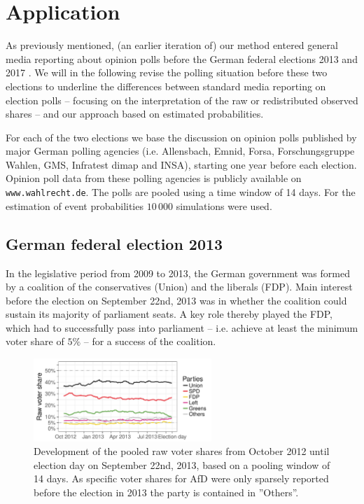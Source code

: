 \documentclass[smallcondensed]{svjour3}     %
\begin{document}
\section{Application} \label{sec:application}
As previously mentioned, (an earlier iteration of) our method entered
general media reporting about opinion polls before the German federal elections
2013 and 2017 \citep[cf.][]{wahlistik_2013, gelitz_2017}.
We will in the following revise the polling situation before these two elections
to underline the differences between standard media reporting on election polls
-- focusing on the interpretation of the raw or redistributed observed shares --
and our approach based on estimated probabilities.

For each of the two elections we base the discussion on opinion polls published
by major German polling agencies (i.e. Allensbach, Emnid, Forsa, Forschungsgruppe Wahlen,
GMS, Infratest dimap and INSA), starting one year before each election.
Opinion poll data from these polling agencies is publicly available
on \texttt{www.wahlrecht.de}. The polls are pooled using a time window
of 14 days. For the estimation of event probabilities $10\,000$ simulations
were used.


\subsection{German federal election 2013} \label{subsec:2013}
In the legislative period from 2009 to 2013, the German government was formed by
a coalition of the conservatives (Union) and the liberals (FDP).
Main interest before the election on September 22nd, 2013 was in whether the
coalition could sustain its majority of parliament seats. A key role thereby played the FDP,
which had to successfully pass into parliament -- i.e. achieve at least the
minimum voter share of $5\%$ -- for a success of the coalition.

\begin{figure}[H]\centering
\includegraphics[width=0.6\textwidth]{figures/2013_pooled_rawShares.pdf}
\caption{Development of the pooled raw voter shares from October 2012 until election day on September 22nd, 2013, based on a pooling window of 14 days.
As specific voter shares for AfD were only sparsely reported before the election in 2013 the party is contained in ''Others''.
\label{fig:2013}
}
\end{figure}
\end{document}
